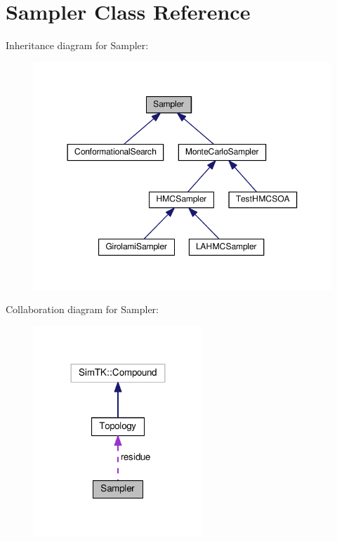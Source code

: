 \hypertarget{classSampler}{}\section{Sampler Class Reference}
\label{classSampler}


Inheritance diagram for Sampler\+:\nopagebreak
\begin{figure}[H]
\begin{center}
\leavevmode
\includegraphics[width=350pt]{classSampler__inherit__graph}
\end{center}
\end{figure}


Collaboration diagram for Sampler\+:\nopagebreak
\begin{figure}[H]
\begin{center}
\leavevmode
\includegraphics[width=180pt]{classSampler__coll__graph}
\end{center}
\end{figure}
